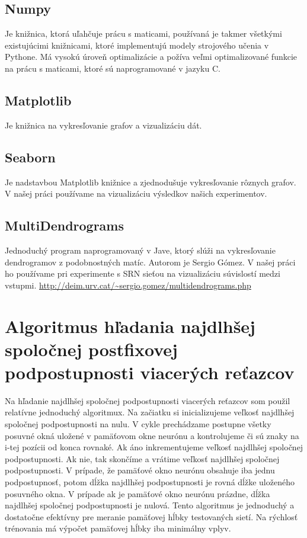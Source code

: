 \subsection{Numpy}
Je knižnica, ktorá uľahčuje prácu s maticami, používaná je takmer všetkými existujúcimi
knižnicami, ktoré implementujú modely strojového učenia v Pythone. Má vysokú úroveň optimalizácie
a požíva veľmi optimalizované funkcie na prácu s maticami, ktoré sú naprogramované v jazyku C.
\subsection{Matplotlib}
Je knižnica na vykresľovanie grafov a vizualizáciu dát.
\subsection{Seaborn}
Je nadstavbou Matplotlib knižnice a zjednodušuje vykresľovanie rôznych grafov. V našej práci používame
na vizualizáciu výsledkov našich experimentov.
\subsection{MultiDendrograms}
Jednoduchý program naprogramovaný v Jave, ktorý slúži na vykresľovanie dendrogramov z podobnostných matíc. 
Autorom je Sergio Gómez. V našej práci ho používame pri experimente s SRN sieťou na vizualizáciu
súvislostí medzi vstupmi.
\url{http://deim.urv.cat/~sergio.gomez/multidendrograms.php}


\section{Algoritmus hľadania najdlhšej spoločnej postfixovej podpostupnosti viacerých reťazcov}
Na hľadanie najdlhšej spoločnej podpostupnosti viacerých reťazcov som použil relatívne jednoduchý algoritmux.
Na začiatku si inicializujeme veľkosť najdlhšej spoločnej podpostupnosti na nulu.
V cykle prechádzame postupne všetky posuvné okná uložené v pamäťovom okne neurónu a kontrolujeme
či sú znaky na i-tej pozícii od konca rovnaké. Ak áno inkrementujeme veľkosť najdlhšej spoločnej podpostupnosti.
Ak nie, tak skončíme a vrátime veľkosť najdlhšej spoločnej podpostupnosti.
V prípade, že pamäťové okno neurónu obsahuje iba jednu podpostupnosť, potom dĺžka najdlhšej podpostupnosti je 
rovná dĺžke uloženého posuvného okna. V prípade ak je pamäťové okno neurónu prázdne, dĺžka najdlhšej spoločnej
podpostupnosti je nulová.
Tento algoritmus je jednoduchý a dostatočne efektívny pre meranie pamäťovej hĺbky testovaných sietí. 
Na rýchlosť trénovania má výpočet pamäťovej hĺbky iba minimálny vplyv.

